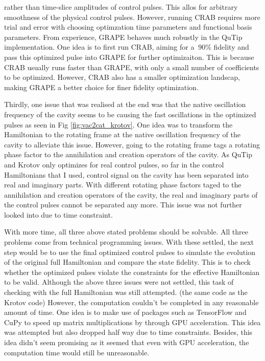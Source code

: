\documentclass[12pt]{report}
\begin{document}
rather than time-slice amplitudes of control pulses. This allos for arbitrary smoothness of the physical control pulses.
However, running CRAB requires more trial and error with choosing optimzation time parameters and functional basis parameters. 
From experience, GRAPE behaves much robustly in the QuTip implementation. One idea is to first run CRAB, aiming for a $~90\%$ fidelity and pass this optimized pulse into GRAPE for further optimizaiton. 
This is because CRAB usually runs faster than GRAPE, with only a small number of coefficients to be optimized. However, CRAB also has a smaller optimization landscap, making GRAPE a better choice for finer fidelity optimization. 
\par
Thirdly, one issue that was realised at the end was that the native oscillation frequency of the cavity seems to be causing the fast oscillations in the optimized pulses as seen in Fig \ref{fig:vac2cat_krotov}.
One idea was to transform the Hamiltonian to the rotating frame at the native oscillation frequency of the cavity to alleviate this issue. 
However, going to the rotating frame tags a rotating phase factor to the annihilation and creation operators of the cavity. 
As QuTip and Krotov only optimizes for real control pulses, so far in the control Hamiltonians that I used, control signal on the cavity has been separated into real and imaginary parts. 
With different rotating phase factors taged to the annihilation and creation operators of the cavity, the real and imaginary parts of the control pulses cannot be separated any more. 
This issue was not further looked into due to time constraint. 
\par
With more time, all three above stated problems should be solvable. All three problems come from technical programming issues. 
With these settled, the next step would be to use the final optimized control pulses to simulate the evolution of the original full Hamiltonian and compare the state fidelity. 
This is to check whether the optimized pulses violate the constraints for the effective Hamiltonian to be valid. 
Although the above three issues were not settled, this task of checking with the full Hamiltonian was still attempted. (the same code as the Krotov code)
However, the computation couldn't be completed in any reasonable amount of time. 
One idea is to make use of packages such as TensorFlow and CuPy to speed up matrix multiplications by through GPU acceleration.
This idea was attempted but also dropped half way due to time constraints. 
Besides, this idea didn't seem promising as it seemed that even with GPU acceleration, the computation time would still be unreasonable. 
\end{document}
